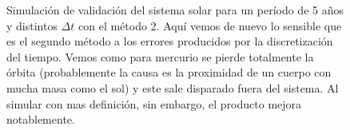 \begin{figure}
{	\label{fig:ej2_m2_1825_12}
	}
	\caption{
		Simulación de validación del sistema solar para un período de 5 años y distintos $\Delta t$
		con el método 2.
		Aquí vemos de nuevo lo sensible que es el segundo método a los errores producidos por la discretización del tiempo.
		Vemos como para mercurio se pierde totalmente la órbita
		(probablemente la causa es la proximidad de un cuerpo con mucha masa como el sol)
		y este sale disparado fuera del sistema. Al simular con mas definición, sin embargo, el producto mejora notablemente.
	}
	\label{ fig:res_ej2_m2_1825 }
\end{figure}
